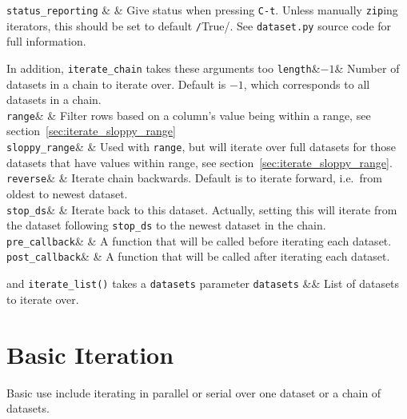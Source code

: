   \RP \texttt{status\_reporting} & \pyTrue & Give status when
  pressing \texttt{C-t}.  Unless manually \texttt{zip}ing iterators,
  this should be set to default \texttt/True/.
  See \texttt{dataset.py} source code for full information.\\
\stoptable

\noindent In addition, \texttt{iterate\_chain} takes these arguments too
\starttable
  \RP \texttt{length}&$-1$& Number of datasets in a chain to iterate
  over.  Default is $-1$, which corresponds to all datasets in a
  chain.\\[1ex]
  
  \RP \texttt{range}& \pyNone& Filter rows based on a column's value
  being within a range, see
  section~\ref{sec:iterate_sloppy_range}\\[1ex]

  \RP \texttt{sloppy\_range}& \pyFalse & Used with \texttt{range}, but
  will iterate over full datasets for those datasets that have values
  within range, see section~\ref{sec:iterate_sloppy_range}.\\[1ex]
  
  \RP \texttt{reverse}& \pyFalse & Iterate chain backwards.  Default
  is to iterate forward, i.e.\ from oldest to newest dataset.\\[1ex]

  \RP \texttt{stop\_ds}& \pyNone & Iterate back to this dataset.
  Actually, setting this will iterate from the dataset
  following \texttt{stop\_ds} to the newest dataset in the
  chain.\\[1ex]

  \RP \texttt{pre\_callback}& \pyNone & A function that will be called
  before iterating each dataset.\\[1ex]

  \RP \texttt{post\_callback}& \pyNone & A function that will be
  called after iterating each dataset.\\
\stoptable

\noindent and \texttt{iterate\_list()} takes a \texttt{datasets} parameter
\starttable
  \RP \texttt{datasets} &\pyNone& List of datasets to iterate over.\\
\stoptable



\section{Basic Iteration}
Basic use include iterating in parallel or serial over one dataset or
a chain of datasets.



